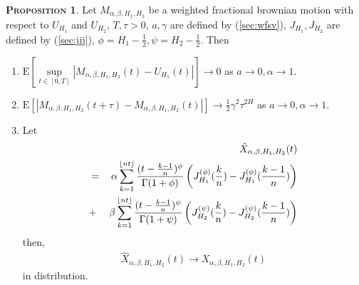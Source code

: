 \documentclass[a4paper, twoside, 11pt]{article}
\theoremstyle{definition}
\newtheorem{proposition}[definition]{\scshape Proposition}
\DeclarePairedDelimiter\floor{\lfloor}{\rfloor}
\newcommand{\brkt}[1]{\left({#1} \right)}
\begin{document}
\begin{proposition}
  Let $M_{\alpha,\beta,H_1,H_2}$ be a weighted fractional brownian motion with respect to $U_{H_1}$ and $U_{H_2}$, $T, \tau>0$, $a, \gamma$ are defined by (\ref{sec:wfsv}), $J_{H_1}, J_{H_2}$ are defined by (\ref{sec:jjj}), $\phi=H_1-\frac{1}{2}, \psi=H_2-\frac{1}{2}$. Then
\begin{enumerate}[topsep=0pt, itemsep=-1ex, partopsep=1ex, parsep=1ex, label=(\roman*)]	
  \item $\mathrm{E}[\sup\limits_{t\in[0,T]}|M_{\alpha,\beta,H_1,H_2}(t) - U_{H_1}(t)|] \rightarrow 0$
	as $a\rightarrow 0, \alpha\rightarrow 1$.
  \item $\mathrm{E}[|M_{\alpha,\beta,H_1,H_2}(t+\tau) - M_{\alpha,\beta,H_1,H_2}(t)|] \rightarrow \frac{1}{2}  \gamma^2 \tau^{2H}$
	as $a\rightarrow 0, \alpha\rightarrow 1$.
  \item Let 
	\begin{eqnarray}
	  &&\hat{X}_{\alpha,\beta,H_1,H_2}(t) \\
	  &=&  \alpha\sum_{k=1}^{\floor{nt}} \frac{(t - \frac{k-1}{n})^\phi}{\Gamma(1+\phi)} \brkt{J_{H_1}^{(\phi)}(\frac{k}{n}) - J_{H_1}^{(\phi)}(\frac{k-1}{n})} \\
	  &+& \beta\sum_{k=1}^{\floor{nt}} \frac{(t - \frac{k-1}{n})^\psi}{\Gamma(1+\psi)} \brkt{J_{H_2}^{(\psi)}(\frac{k}{n}) - J_{H_2}^{(\psi)}(\frac{k-1}{n})}
	  \label{sec:disc}
	\end{eqnarray}
	then,
	\begin{eqnarray*}
	  \hat{X}_{\alpha,\beta,H_1,H_2}(t) \rightarrow X_{\alpha,\beta,H_1,H_2}(t)
	\end{eqnarray*}
	in distribution.
  \end{enumerate}
  \end{proposition}
\end{document}
